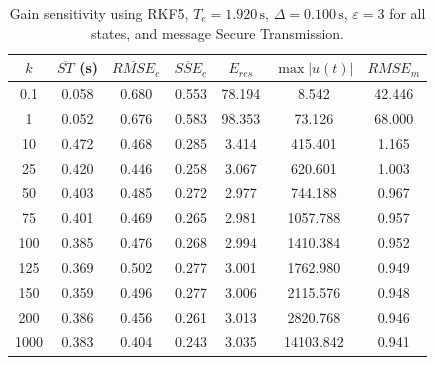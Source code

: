 \begin{table}[!t]
\centering
\caption{Gain sensitivity using RKF5, $T_e=1.920\,\mathrm{s}$, $\Delta=0.100\,\mathrm{s}$, $\varepsilon=3$ for all states, and message Secure Transmission.}
\begin{tabular}{c|cccccc}
\hline
$k$ & $\overline{ST}$ (s) & $\overline{RMSE}_e$ & $\overline{SSE}_e$ & $E_{res}$ & $\max |u(t)|$ & $RMSE_m$ \\
\hline
0.1 & 0.058 & 0.680 & 0.553 & 78.194 & 8.542 & 42.446 \\
1 & 0.052 & 0.676 & 0.583 & 98.353 & 73.126 & 68.000 \\
10 & 0.472 & 0.468 & 0.285 & 3.414 & 415.401 & 1.165 \\
25 & 0.420 & 0.446 & 0.258 & 3.067 & 620.601 & 1.003 \\
50 & 0.403 & 0.485 & 0.272 & 2.977 & 744.188 & 0.967 \\
75 & 0.401 & 0.469 & 0.265 & 2.981 & 1057.788 & 0.957 \\
100 & 0.385 & 0.476 & 0.268 & 2.994 & 1410.384 & 0.952 \\
125 & 0.369 & 0.502 & 0.277 & 3.001 & 1762.980 & 0.949 \\
150 & 0.359 & 0.496 & 0.277 & 3.006 & 2115.576 & 0.948 \\
200 & 0.386 & 0.456 & 0.261 & 3.013 & 2820.768 & 0.946 \\
1000 & 0.383 & 0.404 & 0.243 & 3.035 & 14103.842 & 0.941 \\
\hline
\end{tabular}
\end{table}
